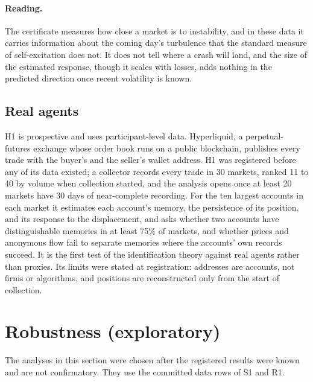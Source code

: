 \documentclass[12pt]{article}
\theoremstyle{definition}
\theoremstyle{remark}
\begin{document}
\paragraph{Reading.} The certificate measures how close a market is to instability, and in these data it carries information about the coming day's turbulence that the standard measure of self-excitation does not. It does not tell where a crash will land, and the size of the estimated response, though it scales with losses, adds nothing in the predicted direction once recent volatility is known.

\subsection{Real agents}\label{sec:h1}

H1 is prospective and uses participant-level data. Hyperliquid, a perpetual-futures exchange whose order book runs on a public blockchain, publishes every trade with the buyer's and the seller's wallet address. H1 was registered before any of its data existed; a collector records every trade in 30 markets, ranked 11 to 40 by volume when collection started, and the analysis opens once at least 20 markets have 30 days of near-complete recording. For the ten largest accounts in each market it estimates each account's memory, the persistence of its position, and its response to the displacement, and asks whether two accounts have distinguishable memories in at least 75\% of markets, and whether prices and anonymous flow fail to separate memories where the accounts' own records succeed. It is the first test of the identification theory against real agents rather than proxies. Its limits were stated at registration: addresses are accounts, not firms or algorithms, and positions are reconstructed only from the start of collection.

\section{Robustness (exploratory)}\label{sec:robust}

The analyses in this section were chosen after the registered results were known and are not confirmatory. They use the committed data rows of S1 and R1.
\end{document}
